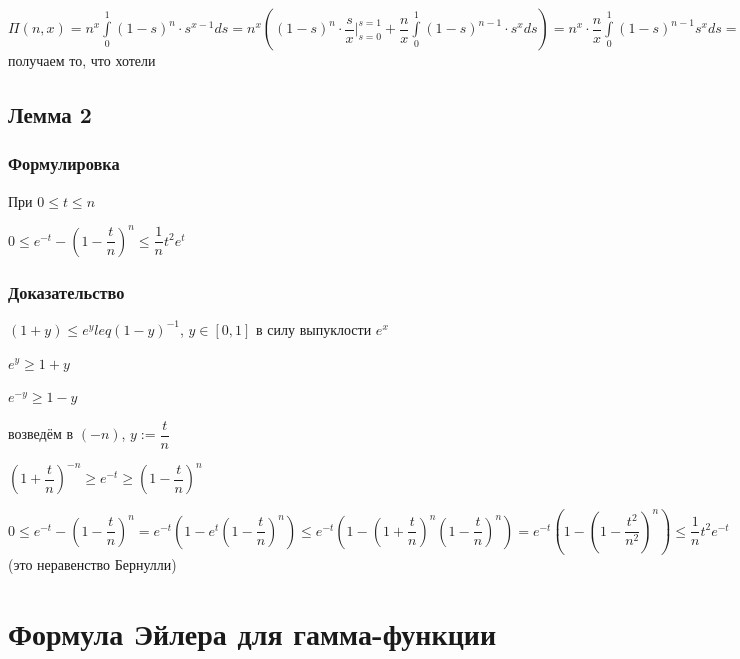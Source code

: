 \documentclass{article}
\begin{document}
                $\Pi(n, x) = n^x \int\limits^1_0 (1 - s)^n \cdot s^{x - 1} ds = n^x \left(  (1 - s)^n \cdot \dfrac{s}{x} \bigg|^{s = 1}_{s = 0} + \dfrac{n}{x} \int\limits^1_0 (1 - s)^{n - 1} \cdot s^x ds \right) = n^x \cdot \dfrac{n}{x} \int\limits^1_0 (1 - s)^{n - 1} s^x ds = n^x \cdot \dfrac{n}{x} \cdot (n - 1) \int\limits^1_0 (1 - s)^{n - 2} s^{x - 1} ds = \ldots$ получаем то, что хотели
                
        \subsection{Лемма 2}
        
            \subsubsection{Формулировка}
            
                При $0 \leq t \leq n$ 
                
                $0 \leq e^{-t} - \left(1 - \dfrac{t}{n} \right)^n \leq \dfrac{1}{n}t^2e^t$
                
            \subsubsection{Доказательство}
            
                $(1 + y) \leq e^yleq (1 - y)^{-1}$, $y \in [0, 1]$ в силу выпуклости $e^x$
                
                $e^y \geq 1 + y$
                
                $e^{-y} \geq 1 - y$
                
                возведём в $(-n)$, $y := \dfrac{t}{n}$
                
                $\left( 1 + \dfrac{t}{n} \right)^{-n} \geq e^{-t} \geq \left(1 - \dfrac{t}{n} \right)^n$
                
                $0 \leq e^{-t} - \left( 1 - \dfrac{t}{n} \right)^n = e^{-t} \left(1 - e^t \left(1 - \dfrac{t}{n} \right)^n \right) \leq e^{-t} \left(1 - \left(1 + \dfrac{t}{n} \right)^n \left( 1 - \dfrac{t}{n}\right)^n\right) = e^{-t} \left(1 - \left(1 - \dfrac{t^2}{n^2} \right)^n \right) \leq \dfrac{1}{n} t^2 e^{-t}$ (это неравенство Бернулли)
                
                
    \newpage
    
    \section{Формула Эйлера для гамма-функции}
    
\end{document}
